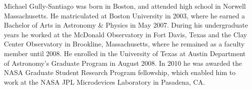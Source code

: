 \documentclass[12pt]{report}	%
\begin{document}
%

%

%


\nocite{*}      %


\printindex%



\begin{vita}
Michael Gully-Santiago was born in Boston, and attended high school in Norwell Massachusetts.  He matriculated at Boston University in 2003, where he earned a Bachelor of Arts in Astronomy \& Physics in May 2007.  During his undergraduate years he worked at the McDonald Observatory in Fort Davis, Texas and the Clay Center Observatory in Brookline, Massachusetts, where he remained as a faculty member until 2008.  He enrolled in the University of Texas at Austin Department of Astronomy's Graduate Program in August 2008.  In 2010 he was awarded the NASA Graduate Student Research Program fellowship, which enabled him to work at the NASA JPL Microdevices Laboratory in Pasadena, CA.  
\end{vita}
\end{document}
